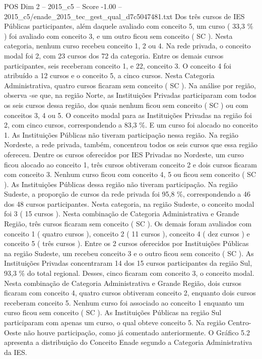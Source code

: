 \begin{textsample}{POS Dim 2 – 2015\_c5 – Score -1.00 – 2015\_c5/enade\_2015\_tec\_gest\_qual\_d7c5047481.txt}
Dos três cursos de IES Públicas participantes, além daquele avaliado com conceito 5, um curso ( 33,3 \% ) foi avaliado com conceito 3, e um outro ficou sem conceito ( SC ).
Nesta categoria, nenhum curso recebeu conceito 1, 2 ou 4.
Na rede privada, o conceito modal foi 2, com 23 cursos dos 72 da categoria.
Entre os demais cursos participantes, seis receberam conceito 1, e 22, conceito 3.
O conceito 4 foi atribuído a 12 cursos e o conceito 5, a cinco cursos.
Nesta Categoria Administrativa, quatro cursos ficaram sem conceito ( SC ).
Na análise por região, observa -se que, na região Norte, as Instituições Privadas participaram com todos os seis cursos dessa região, dos quais nenhum ficou sem conceito ( SC ) ou com conceitos 3, 4 ou 5.
O conceito modal para as Instituições Privadas na região foi 2, com cinco cursos, correspondendo a 83,3 \%.
E um curso foi alocado no conceito 1.
As Instituições Públicas não tiveram participação nessa região.
Na região Nordeste, a rede privada, também, concentrou todos os seis cursos que essa região ofereceu.
Dentre os cursos oferecidos por IES Privadas no Nordeste, um curso ficou alocado ao conceito 1, três cursos obtiveram conceito 2 e dois cursos ficaram com conceito 3.
Nenhum curso ficou com conceito 4, 5 ou ficou sem conceito ( SC ).
As Instituições Públicas dessa região não tiveram participação.
Na região Sudeste, a proporção de cursos da rede privada foi 95,8 \%, correspondendo a 46 dos 48 cursos participantes.
Nesta categoria, na região Sudeste, o conceito modal foi 3 ( 15 cursos ).
Nesta combinação de Categoria Administrativa e Grande Região, três cursos ficaram sem conceito ( SC ).
Os demais foram avaliados com conceito 1 ( quatro cursos ), conceito 2 ( 11 cursos ), conceito 4 ( dez cursos ) e conceito 5 ( três cursos ).
Entre os 2 cursos oferecidos por Instituições Públicas na região Sudeste, um recebeu conceito 3 e o outro ficou sem conceito ( SC ).
As Instituições Privadas concentraram 14 dos 15 cursos participantes da região Sul, 93,3 \% do total regional.
Desses, cinco ficaram com conceito 3, o conceito modal.
Nesta combinação de Categoria Administrativa e Grande Região, dois cursos ficaram com conceito 4, quatro cursos obtiveram conceito 2, enquanto dois cursos receberam conceito 5.
Nenhum curso foi associado ao conceito 1 enquanto um curso ficou sem conceito ( SC ).
As Instituições Públicas na região Sul participaram com apenas um curso, o qual obteve conceito 5.
Na região Centro-Oeste não houve participação, como já comentado anteriormente.
O Gráfico 5.2 apresenta a distribuição do Conceito Enade segundo a Categoria Administrativa da IES.

\end{textsample}
